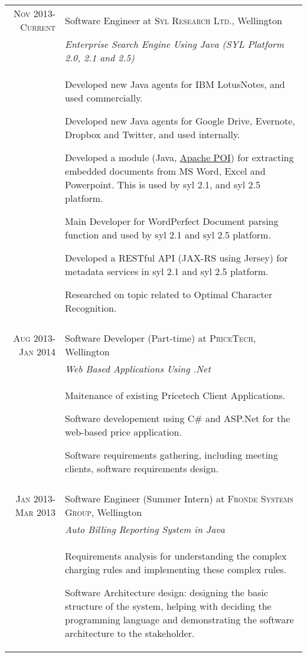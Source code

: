 \documentclass[a4paper,10pt]{article} %
\begin{document}
\begin{tabular}{r|p{11cm}}
\textsc{Nov 2013-Current} & Software Engineer at \textsc{Syl Research Ltd.}, Wellington \\
& \emph{Enterprise Search Engine Using Java (SYL Platform 2.0, 2.1 and 2.5)}\\ 
& \footnotesize{
Developed new Java agents for IBM LotusNotes, and used commercially.

Developed new Java agents for Google Drive, Evernote, Dropbox and Twitter, and used internally.

Developed a module (Java,  \href{http://poi.apache.org/}{Apache POI}) for extracting embedded documents from MS Word, Excel and Powerpoint. This is used by syl 2.1, and syl 2.5 platform.

Main Developer for WordPerfect Document parsing function and used by syl 2.1 and syl 2.5 platform.

Developed a RESTful API (JAX-RS using Jersey) for metadata services in syl 2.1 and syl 2.5 platform.

Researched on topic related to Optimal Character Recognition.
}\\
\multicolumn{2}{c}{} \\


\textsc{Aug 2013-Jan 2014} & Software Developer (Part-time) at \textsc{PriceTech}, Wellington \\
& \emph{Web Based Applications Using .Net}\\ 
& \footnotesize{
Maitenance of existing Pricetech Client Applications.

Software developement using C\# and ASP.Net for the web-based price application.

Software requirements gathering, including meeting clients, software requirements design.
}\\
\multicolumn{2}{c}{} \\



\textsc{Jan 2013-Mar 2013} & Software Engineer (Summer Intern) at \textsc{Fronde Systems Group}, Wellington \\
& \emph{Auto Billing Reporting System in Java}\\ 
& \footnotesize{
Requirements analysis for understanding the complex charging rules and implementing these complex rules.

Software Architecture design: designing the basic structure of the system, helping with deciding the programming language and demonstrating the software architecture to the stakeholder.

}
\end{tabular}
\end{document}
